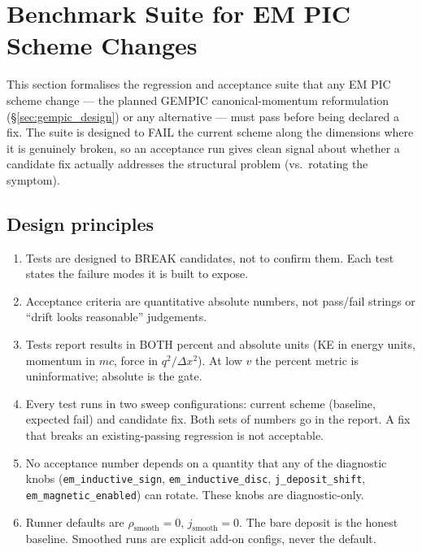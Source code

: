\documentclass[11pt,a4paper]{article}
\begin{document}
\newpage

\section{Benchmark Suite for EM PIC Scheme Changes}
\label{sec:gempic_benchmark}

This section formalises the regression and acceptance suite that any
EM PIC scheme change --- the planned GEMPIC canonical-momentum
reformulation (§\ref{sec:gempic_design}) or any alternative --- must
pass before being declared a fix.  The suite is designed to FAIL the
current scheme along the dimensions where it is genuinely broken, so
an acceptance run gives clean signal about whether a candidate fix
actually addresses the structural problem (vs.\ rotating the
symptom).

\subsection{Design principles}

\begin{enumerate}
  \item Tests are designed to BREAK candidates, not to confirm them.
    Each test states the failure modes it is built to expose.
  \item Acceptance criteria are quantitative absolute numbers, not
    pass/fail strings or ``drift looks reasonable'' judgements.
  \item Tests report results in BOTH percent and absolute units (KE
    in energy units, momentum in $mc$, force in $q^2/\Delta x^2$).
    At low $v$ the percent metric is uninformative; absolute is the
    gate.
  \item Every test runs in two sweep configurations: current scheme
    (baseline, expected fail) and candidate fix.  Both sets of
    numbers go in the report.  A fix that breaks an existing-passing
    regression is not acceptable.
  \item No acceptance number depends on a quantity that any of the
    diagnostic knobs (\texttt{em\_inductive\_sign},
    \texttt{em\_inductive\_disc}, \texttt{j\_deposit\_shift},
    \texttt{em\_magnetic\_enabled}) can rotate.  These knobs are
    diagnostic-only.
  \item Runner defaults are $\rho_{\mathrm{smooth}}=0$,
    $j_{\mathrm{smooth}}=0$.  The bare deposit is the honest baseline.
    Smoothed runs are explicit add-on configs, never the default.
\end{enumerate}
\end{document}
